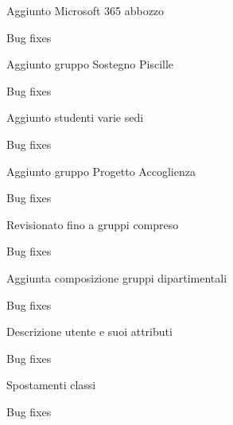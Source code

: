 \begin{changelog}[author=JOHN DOE, sectioncmd=\chapter*]
				\begin{version}[v=1.9.9.4,
		date=2023-12-28]
		\added
		\item Aggiunto Microsoft 365 abbozzo
		\fixed
		\item Bug fixes
	\end{version}
			\begin{version}[v=1.9.9.3,
		date=2023-09-22]
		\added
		\item Aggiunto gruppo Sostegno Piscille
		\fixed
		\item Bug fixes
	\end{version}
		\begin{version}[v=1.9.9.2,
		date=2023-09-20]
		\added
		\item Aggiunto studenti varie sedi
		\fixed
		\item Bug fixes
	\end{version}
		\begin{version}[v=1.9.9.1,
		date=2023-09-07]
		\added
		\item Aggiunto gruppo Progetto Accoglienza
		\fixed
		\item Bug fixes
	\end{version}
	\begin{version}[v=1.9.9,
		date=2023-08-25]
		\added
		\item Revisionato fino a gruppi compreso
		\fixed
		\item Bug fixes
	\end{version}
	\begin{version}[v=1.0.6,
		date=2023-08-14]
		\added
		\item Aggiunta composizione gruppi dipartimentali
		\fixed
		\item Bug fixes
	\end{version}
	\begin{version}[v=1.0.5,
		date=2023-08-11]
		\added
		\item Descrizione utente e suoi attributi
		\fixed
		\item Bug fixes
	\end{version}
	\begin{version}[v=1.0.4,
		date=2023-07-25]
		\added
		\item Spostamenti classi
		\fixed
		\item Bug fixes
	\end{version}

\end{changelog}
